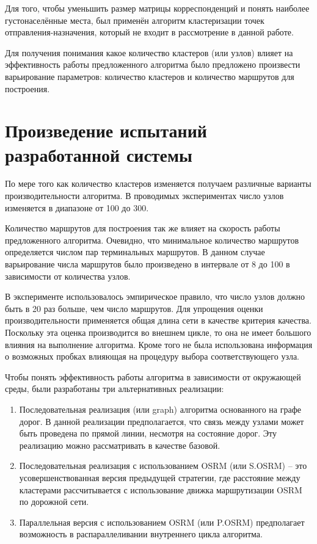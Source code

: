\documentclass[a4paper, 14pt]{extreport}
\begin{document}
    Для того, чтобы уменьшить размер матрицы корреспонденций и понять наиболее густонаселённые места, был применён 
    алгоритм кластеризации точек отправления-назначения, который не входит в рассмотрение в данной работе.

    Для получения понимания какое количество кластеров (или узлов) влияет на эффективность работы предложенного 
    алгоритма было предложено произвести варьирование параметров: количество кластеров и количество маршрутов для 
    построения.

    \chapter{Произведение испытаний разработанной системы}
    По мере того как количество кластеров изменяется получаем различные варианты производительности алгоритма. В 
    проводимых экспериментах число узлов изменяется в диапазоне от 100 до 300.

    Количество маршрутов для построения так же влияет на скорость работы предложенного алгоритма. Очевидно, что 
    минимальное количество маршрутов определяется числом пар терминальных маршрутов. В данном случае варьирование числа 
    маршрутов было произведено в интервале от 8 до 100 в зависимости от количества узлов.

    В эксперименте использовалось эмпирическое правило, что число узлов должно быть в 20 раз больше, чем число 
    маршрутов. Для упрощения оценки производительности применяется общая длина сети в качестве критерия качества.
    Поскольку эта оценка производится во внешнем цикле, то она не имеет большого влияния на выполнение алгоритма. Кроме 
    того не была использована информация о возможных пробках влияющая на процедуру выбора соответствующего узла.

    Чтобы понять эффективность работы алгоритма в зависимости от окружающей среды, были разработаны три альтернативных 
    реализации:
    \begin{enumerate}
        \item Последовательная реализация (или graph) алгоритма основанного на графе дорог. В данной реализации 
            предполагается, что связь между узлами может быть проведена по прямой линии, несмотря на состояние 
            дорог. Эту реализацию можно рассматривать в качестве базовой.
        \item Последовательная реализация с использованием OSRM (или S.OSRM) -- это усовершенствованная версия 
            предыдущей стратегии, где расстояние между кластерами рассчитывается с использование движка 
            маршрутизации OSRM по дорожной сети.
        \item Параллельная версия с использованием OSRM (или P.OSRM) предполагает возможность в распараллеливании 
            внутреннего цикла алгоритма.  
    \end{enumerate}
\end{document}

